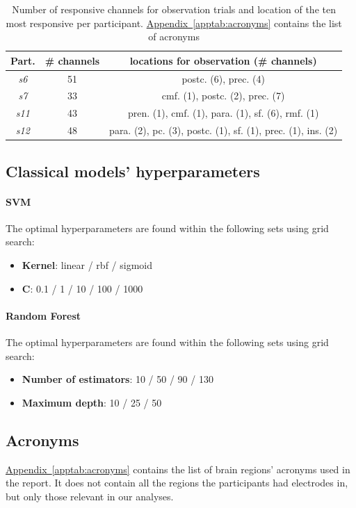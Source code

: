 \documentclass[10pt,conference,compsocconf]{IEEEtran}
\newcommand{\aref}[1]{\hyperref[#1]{Appendix~\ref*{#1}}}
\begin{document}
\begin{table}[h!]
    \centering
    \begin{tabular}{| c | c | c |}
        \hline
        Part. & \# channels & locations for observation (\# channels) \\
        \hline
        \textit{s6} & 51 & postc. (6), prec. (4)\\
        \hline
        \textit{s7} & 33 & cmf. (1), postc. (2), prec. (7) \\
        \hline
        \textit{s11} & 43 & pren. (1), cmf. (1), para. (1), sf. (6), rmf. (1)\\
        \hline
        \textit{s12} & 48 & para. (2), pc. (3), postc. (1), sf. (1), prec. (1), ins. (2)\\
        \hline
    \end{tabular}
    \caption{Number of responsive channels for observation trials and location of the ten most responsive per participant. \aref{apptab:acronyms} contains the list of acronyms}
    \label{apptab:obsmovchannellocations}
\end{table}

\subsection{Classical models' hyperparameters}
\label{subsec:mlhyperparams}
\paragraph{SVM}
The optimal hyperparameters are found within the following sets using grid search:
\begin{itemize}
    \item \textbf{Kernel}: linear / rbf / sigmoid
    \item \(\mathbf{C}\): 0.1 / 1 / 10 / 100 / 1000
\end{itemize}
\paragraph{Random Forest}
The optimal hyperparameters are found within the following sets using grid search:
\begin{itemize}
    \item \textbf{Number of estimators}: 10 / 50 / 90 / 130
    \item \textbf{Maximum depth}: 10 / 25 / 50
\end{itemize}

\subsection{Acronyms}
\aref{apptab:acronyms} contains the list of brain regions' acronyms used in the report. It does not contain all the regions the participants had electrodes in, but only those relevant in our analyses.
\end{document}
